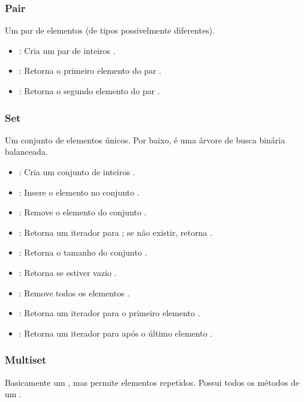 \subsubsection{Pair}

Um par de elementos (de tipos possivelmente diferentes).
\begin{itemize}\setlength\itemsep{0pt}
    \item {}: Cria um par de inteiros .
    \item {}: Retorna o primeiro elemento do par .
    \item {}: Retorna o segundo elemento do par .
\end{itemize}

\subsubsection{Set}

Um conjunto de elementos únicos. Por baixo, é uma árvore de busca binária balanceada.
\begin{itemize}\setlength\itemsep{0pt}
    \item {}: Cria um conjunto de inteiros .
    \item {}: Insere o elemento  no conjunto .
    \item {}: Remove o elemento  do conjunto .
    \item {}: Retorna um iterador para ; se  não existir, retorna  .
    \item {}: Retorna o tamanho do conjunto .
    \item {}: Retorna  se estiver vazio .
    \item {}: Remove todos os elementos .
    \item {}: Retorna um iterador para o primeiro elemento .
    \item {}: Retorna um iterador para após o último elemento .
\end{itemize}

\subsubsection{Multiset}

Basicamente um , mas permite elementos repetidos. Possui todos os métodos de um .

